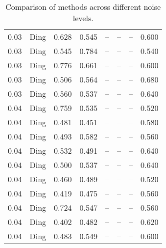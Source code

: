 \begin{table}[H]
\begin{tabular}{l c l l l}
0.03 & Ding & 0.628 & 0.545 & -- & -- & -- & 0.600 \\
0.03 & Ding & 0.545 & 0.784 & -- & -- & -- & 0.540 \\
0.03 & Ding & 0.776 & 0.661 & -- & -- & -- & 0.600 \\
0.03 & Ding & 0.506 & 0.564 & -- & -- & -- & 0.680 \\
0.03 & Ding & 0.560 & 0.537 & -- & -- & -- & 0.640 \\
0.04 & Ding & 0.759 & 0.535 & -- & -- & -- & 0.520 \\
0.04 & Ding & 0.481 & 0.451 & -- & -- & -- & 0.580 \\
0.04 & Ding & 0.493 & 0.582 & -- & -- & -- & 0.560 \\
0.04 & Ding & 0.532 & 0.491 & -- & -- & -- & 0.640 \\
0.04 & Ding & 0.500 & 0.537 & -- & -- & -- & 0.640 \\
0.04 & Ding & 0.460 & 0.489 & -- & -- & -- & 0.520 \\
0.04 & Ding & 0.419 & 0.475 & -- & -- & -- & 0.560 \\
0.04 & Ding & 0.724 & 0.547 & -- & -- & -- & 0.560 \\
0.04 & Ding & 0.402 & 0.482 & -- & -- & -- & 0.620 \\
0.04 & Ding & 0.483 & 0.549 & -- & -- & -- & 0.600 \\
\midrule
\bottomrule
\end{tabular}
\label{tab:SyntheticNoise}
\caption{Comparison of methods across different noise levels.}
\end{table}
